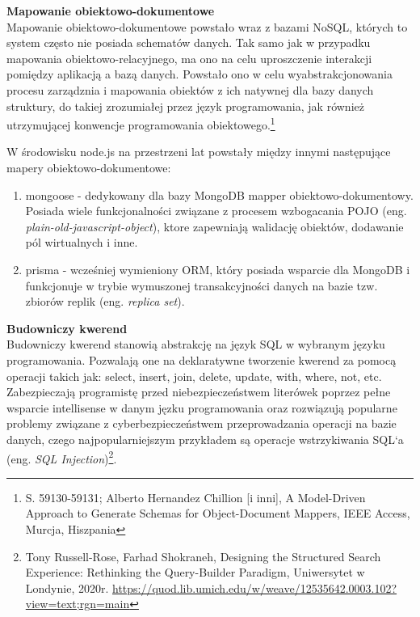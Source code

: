 \documentclass[12pt, a4paper, twoside, openany]{book}
\newcommand{\forceindent}{\leavevmode{\parindent=1.3em\indent}}
\begin{document}
\textbf{Mapowanie obiektowo-dokumentowe\\}
\forceindent Mapowanie obiektowo-dokumentowe powstało wraz z bazami NoSQL, których to system często nie posiada schematów danych.
Tak samo jak w przypadku mapowania obiektowo-relacyjnego, ma ono na celu uproszczenie interakcji pomiędzy aplikacją a bazą danych. Powstało ono w celu wyabstrakcjonowania procesu zarządznia i mapowania obiektów z ich natywnej dla bazy danych struktury, do takiej zrozumiałej przez język programowania, jak również utrzymującej konwencje programowania obiektowego.\footnote{S. 59130-59131; Alberto Hernandez Chillion [i inni], A Model-Driven Approach to Generate Schemas for Object-Document Mappers, IEEE Access, Murcja, Hiszpania}

W środowisku node.js na przestrzeni lat powstały między innymi następujące mapery obiektowo-dokumentowe:
\begin{enumerate}[label=--]
    \item mongoose - dedykowany dla bazy MongoDB mapper obiektowo-dokumentowy. Posiada wiele funkcjonalności związane z procesem wzbogacania POJO (eng. \textit{plain-old-javascript-object}), ktore zapewniają walidację obiektów, dodawanie pól wirtualnych i inne.
    \item prisma - wcześniej wymieniony ORM, który posiada wsparcie dla MongoDB i funkcjonuje w trybie wymuszonej transakcyjności danych na bazie tzw. zbiorów replik (eng. \textit{replica set}).
\end{enumerate}

\textbf{Budowniczy kwerend\\}
\forceindent  Budowniczy kwerend stanowią abstrakcję na język SQL w wybranym języku programowania.
Pozwalają one na deklaratywne tworzenie kwerend za pomocą operacji takich jak: select, insert, join, delete, update, with, where, not, etc.
Zabezpieczają programistę przed niebezpieczeństwem literówek poprzez pełne wsparcie intellisense w danym jęzku programowania oraz rozwiązują popularne problemy związane z cyberbezpieczeństwem przeprowadzania operacji na bazie danych, czego najpopularniejszym przykładem są operacje wstrzykiwania SQL`a (eng. \textit{SQL Injection})\footnote{Tony Russell-Rose, Farhad Shokraneh, Designing the Structured Search Experience: Rethinking the Query-Builder Paradigm, Uniwersytet w Londynie, 2020r. \url{https://quod.lib.umich.edu/w/weave/12535642.0003.102?view=text;rgn=main}}.
\end{document}
